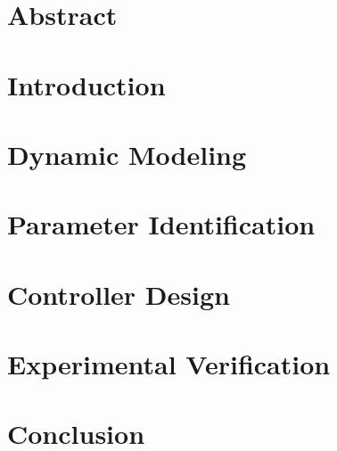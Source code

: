 \documentclass[12pt,twoside]{report}
\begin{document}

\thispagestyle{empty}



\chapter*{Abstract}

\cleardoublepage

\tableofcontents

\cleardoublepage

\cleardoublepage







\chapter{Introduction}

\cleardoublepage

\chapter{Dynamic Modeling}

\cleardoublepage

\chapter{Parameter Identification}

\cleardoublepage


\chapter{Controller Design}

\cleardoublepage


\chapter{Experimental Verification}

\cleardoublepage

\chapter{Conclusion}

\cleardoublepage

%
\end{document}
